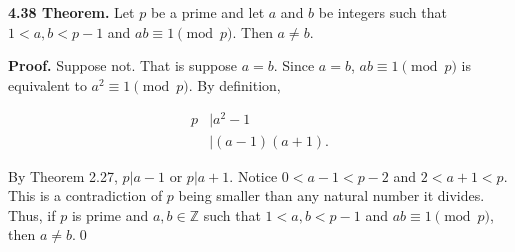 \documentclass[12pt]{article}
\begin{document}
\noindent\textbf{4.38 Theorem.} Let $p$ be a prime and let $a$ and $b$ be integers such that $1 < a,b < p-1$ and $ab\equiv 1\pmod p$. Then $a\not= b$.

\bigskip

\noindent\textbf{Proof.} Suppose not. That is suppose $a=b$. Since $a=b$, $ab\equiv 1\pmod p$ is equivalent to $a^2\equiv 1\pmod p$. By definition,

\begin{align*}
p &| a^2-1 \\
&| (a-1)(a+1).
\end{align*}

\noindent By Theorem 2.27, $p|a-1$ or $p|a+1$. Notice $0<a-1<p-2$ and $2<a+1<p$. This is a contradiction of $p$ being smaller than any natural number it divides. Thus, if $p$ is prime and $a,b\in\mathbb{Z}$ such that $1 < a,b < p-1$ and $ab\equiv 1\pmod p$, then $a\not= b$.\qed
\end{document}
